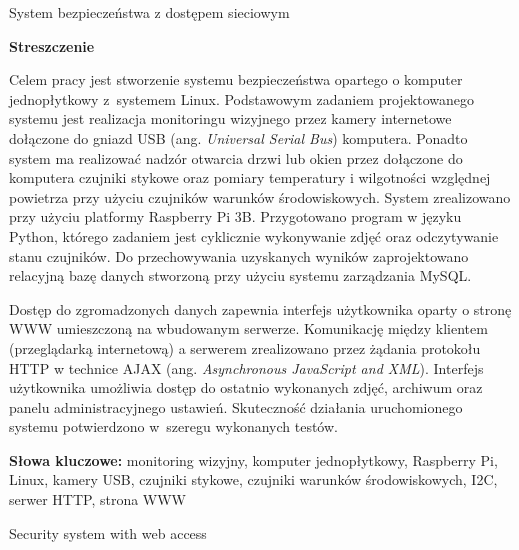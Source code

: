 \documentclass[a4paper,11pt,twoside]{article}
\begin{document}

\null
\thispagestyle{empty}
\newpage

\begin{center}
{\huge System bezpieczeństwa z dostępem sieciowym}
\end{center}

\vspace*{\fill}

\begin{center}
\textbf{Streszczenie}
\end{center}

\noindent
Celem pracy jest stworzenie systemu bezpieczeństwa opartego o komputer jednopłytkowy z~systemem Linux. Podstawowym zadaniem projektowanego systemu jest realizacja monitoringu wizyjnego przez kamery internetowe dołączone do gniazd USB (ang. \textit{Universal Serial Bus}) komputera. Ponadto system ma realizować nadzór otwarcia drzwi lub okien przez dołączone do komputera czujniki stykowe oraz pomiary temperatury i wilgotności względnej powietrza przy użyciu czujników warunków środowiskowych. System zrealizowano przy użyciu platformy Raspberry Pi 3B. Przygotowano program w języku Python, którego zadaniem jest cyklicznie wykonywanie zdjęć oraz odczytywanie stanu czujników. Do przechowywania uzyskanych wyników zaprojektowano relacyjną bazę danych stworzoną przy użyciu systemu zarządzania MySQL. 

Dostęp do zgromadzonych danych zapewnia interfejs użytkownika oparty o stronę WWW umieszczoną na wbudowanym serwerze. Komunikację między klientem (przeglądarką internetową) a serwerem zrealizowano przez żądania protokołu HTTP w technice AJAX (ang. \textit{Asynchronous JavaScript and XML}). Interfejs użytkownika umożliwia dostęp do ostatnio wykonanych zdjęć, archiwum oraz panelu administracyjnego ustawień. Skuteczność działania uruchomionego systemu potwierdzono w~szeregu wykonanych testów.

\vspace{11pt}
\noindent
\textbf{Słowa kluczowe:} monitoring wizyjny, komputer jednopłytkowy, Raspberry Pi, Linux, kamery USB, czujniki stykowe, czujniki warunków środowiskowych, I2C, serwer HTTP, strona WWW

\newpage
\null
\thispagestyle{empty}
\newpage

\thispagestyle{empty}
\begin{center}
{\huge Security system with web access}
\end{center}

\vspace*{\fill}
\end{document}
